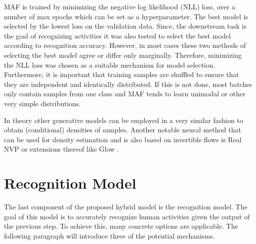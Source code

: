 \documentclass[11pt,titlepage,oneside,openany]{book}
\begin{document}
MAF is trained by minimizing the negative log likelihood (NLL) loss, over a number of max epochs which can be set as a hyperparameter. The best model is selected by the lowest loss on the validation data. Since, the downstream task is the goal of recognizing activities it was also tested to select the best model according to recognition accuracy. However, in most cases these two methods of selecting the best model agree or differ only marginally. Therefore, minimizing the NLL loss was chosen as a suitable mechanism for model selection. Furthermore, it is important that training samples are shuffled to ensure that they are independent and identically distributed. If this is not done, most batches only contain samples from one class and MAF tends to learn unimodal or other very simple distributions.

In theory other generative models can be employed in a very similar fashion to obtain (conditional) densities of samples. Another notable neural method that can be used for density estimation and is also based on invertible flows is Real NVP \cite{dinh_density_2017} or extensions thereof like Glow \cite{kingma_glow_2018}.

\section{Recognition Model}
The last component of the proposed hybrid model is the recognition model. The goal of this model is to accurately recognize human activities given the output of the previous step. To achieve this, many concrete options are applicable. The following paragraph will introduce three of the potential mechanisms.
\end{document}
